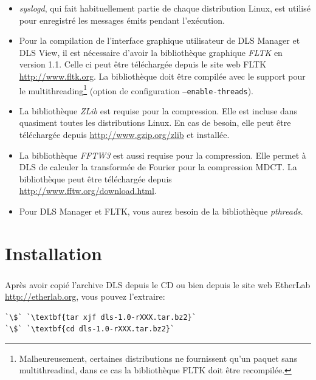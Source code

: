 \documentclass[a4paper,12pt,BCOR6mm,bibtotoc,idxtotoc]{scrbook}
\begin{document}
\begin{itemize}

\item \textit{syslogd}, qui fait habituellement partie
  de chaque distribution Linux, est utilis\'e pour enregistr\'e les
  messages \'emits pendant l'ex\'ecution.

\item Pour la compilation de l'interface graphique utilisateur de DLS
  Manager et DLS View, il est
  n\'ecessaire d'avoir la biblioth\`eque graphique
  \textit{FLTK} en version 1.1.  Celle ci peut \^etre
  t\'el\'echarg\'ee depuis le site web FLTK \url{http://www.fltk.org}.
  La biblioth\`eque doit \^etre compil\'ee avec le support pour le
  multithreading\footnote{Malheureusement, certaines distributions ne
    fournissent qu'un paquet sans multithreadind, dans ce cas la
    biblioth\`eque FLTK doit \^etre recompil\'ee.}  (option de
  configuration \texttt{--enable-threads}).

\item La biblioth\`eque \textit{ZLib} est requise pour la compression.
  Elle est incluse dans quasiment toutes les distributions Linux.
  En cas de besoin, elle peut \^etre t\'el\'echarg\'ee depuis
\url{http://www.gzip.org/zlib} et install\'ee.

\item La biblioth\`eque \textit{FFTW3} est aussi requise pour la
  compression.  Elle permet \`a DLS de calculer la transform\'ee de
  Fourier pour la compression MDCT. La biblioth\`eque peut \^etre
  t\'el\'echarg\'ee depuis \url{http://www.fftw.org/download.html}.

\item Pour DLS Manager et FLTK, vous aurez besoin de la biblioth\`eque
  \textit{pthreads}.

\end{itemize}

\section{Installation}

Apr\`es avoir copi\'e l'archive DLS depuis le CD
\textsuperscript{\textregistered} ou bien depuis le site
web EtherLab\textsuperscript{\textregistered}
\url{http://etherlab.org}, vous pouvez l'extraire:

\begin{lstlisting}
`\$` `\textbf{tar xjf dls-1.0-rXXX.tar.bz2}`
`\$` `\textbf{cd dls-1.0-rXXX.tar.bz2}`
\end{lstlisting}
\end{document}
